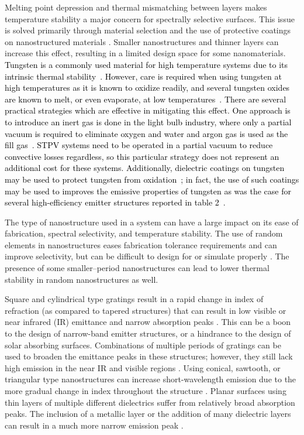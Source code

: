 \documentclass[review]{elsarticle}
\begin{document}
Melting point depression and thermal mismatching between layers makes temperature stability a major concern for spectrally selective surfaces.  This issue is solved primarily through material selection and the use of protective coatings on nanostructured materials \cite{paper1_ref5}.  Smaller nanostructures and thinner layers can increase this effect, resulting in a limited design space for some nanomaterials.  \textcolor{black}{Tungsten is a commonly used material for high temperature systems due to its intrinsic thermal stability~\cite{Palik,Chaud}.  However, 
care is required when using tungsten at high temperatures as it is known to oxidize readily, and several tungsten oxides are known to melt, 
or even evaporate, at low temperatures~\cite{W_Melting}. There are several practical strategies which are effective in 
mitigating this effect.  One approach is to introduce an inert gas is done in the light bulb industry, where only a 
partial vacuum is required to eliminate oxygen and water and argon gas is used as the fill gas~\cite{Lightbulb}. 
STPV systems need to be operated in a partial vacuum to reduce convective losses regardless, so this particular strategy does not
represent an additional cost for these systems. 
Additionally, dielectric coatings on tungsten may be used to protect tungsten from oxidation~\cite{paper1_ref5}; 
in fact, the use of such coatings may be used to improves the emissive properties of tungsten as 
was the case for several high-efficiency emitter structures reported in table 2~\cite{paper1_ref5, real_efficient}.}

The type of nanostructure used in a system can have a large impact on its ease of fabrication, spectral selectivity, and temperature stability.  The use of random elements in nanostructures eases fabrication tolerance requirements and can improve selectivity, but can be difficult to design for or simulate properly \cite{me1}.  The presence of some smaller--period nanostructures can lead to lower thermal stability in random nanostructures as well. 

Square and cylindrical type gratings result in a rapid change in index of refraction (as compared to tapered structures) that can result in low visible or near infrared (IR) emittance and narrow absorption peaks \cite{paper1_ref6,paper2_ref13}.  This can be a boon to the design of narrow-band emitter structures, or a hindrance to the design of solar absorbing surfaces.  Combinations of multiple periods of gratings can be used to broaden the emittance peaks in these structures; however, they still lack high emission in the near IR and visible regions \cite{paper2_ref14}.  Using conical, sawtooth, or triangular type nanostructures can increase short-wavelength emission due to the more gradual change in index throughout the structure \cite{Grann_JOSA,me2}. Planar surfaces using thin layers of multiple different dielectrics suffer from relatively broad absorption peaks.  The inclusion of a metallic layer or the addition of many dielectric layers can result in a much more narrow emission peak \cite{RF_OptExp_2009}.  
\end{document}
